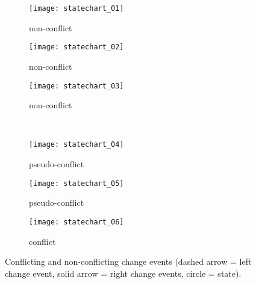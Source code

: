 \begin{figure*}[ht]
  \begin{subfigure}[t]{0.32\linewidth}
    \texttt{[image: statechart\_01]}
    \caption{non-conflict}
    \label{fig:statechart_01}
  \end{subfigure}
  \hfill
  \begin{subfigure}[t]{0.32\linewidth}
    \texttt{[image: statechart\_02]}
    \caption{non-conflict}
    \label{fig:statechart_02}
  \end{subfigure}
  \hfill
  \begin{subfigure}[t]{0.32\linewidth}
    \texttt{[image: statechart\_03]}
    \caption{non-conflict}
    \label{fig:statechart_03}
  \end{subfigure}
  \\
  \begin{subfigure}[t]{0.32\linewidth}
    \texttt{[image: statechart\_04]}
    \caption{pseudo-conflict}
    \label{fig:statechart_04}
  \end{subfigure}
  \hfill
  \begin{subfigure}[t]{0.32\linewidth}
    \texttt{[image: statechart\_05]}
    \caption{pseudo-conflict}
    \label{fig:statechart_05}
  \end{subfigure}
  \hfill
  \begin{subfigure}[t]{0.32\linewidth}
    \texttt{[image: statechart\_06]}
    \caption{conflict}
    \label{fig:statechart_06}
  \end{subfigure}
  \caption{Conflicting and non-conflicting change events (dashed arrow = left change event, solid arrow = right change events, circle = state).}
  \label{fig:conflict_states}
\end{figure*}

